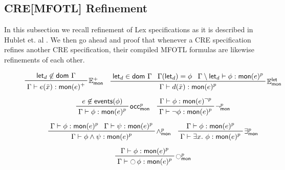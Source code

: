 \subsection{CRE[MFOTL] Refinement}
\label{subsection:refinement-of-cre-specifications}
In this subsection we recall refinement of Lex specifications as it is described in
Hublet et. al \cite{lex}. We then go ahead and proof that whenever a CRE
specification refines another CRE specification, their compiled MFOTL
formulas are likewise refinements of each other.

\begin{figure}
    \begin{gather*}
        \prftree[r]
            {$\Events^+_\mathsf{mon}$}
            {\mathsf{let}_d \not\in \mathsf{dom}~\Gamma}
            {\Gamma \vdash e(\bar{x}) : \mono{e}^+}
        \quad
        \prftree[r]
            {$\Events^\mathsf{let}_\mathsf{mon}$}
            {\mathsf{let}_d \in \mathsf{dom}~\Gamma}
            {\Gamma(\mathsf{let}_d) = \phi} 
            {\Gamma \setminus \mathsf{let}_d \vdash \phi : \mono{e}^p}
            {\Gamma \vdash d(\bar{x}) : \mono{e}^p}
        \\[5pt]
        \prftree[r]
            {$\mathsf{occ}^p_\mathsf{mon}$}
            {e \not \in \events{\phi}}
            {\Gamma \vdash \phi : \mono{e}^p}
        \quad
        \prftree[r]
            {$\neg^p_\mathsf{mon}$}
            {\Gamma \vdash \phi : \mono{e}^{\neg p}}
            {\Gamma \vdash \neg \phi : \mono{e}^p}
        \\[5pt]
        \prftree[r]
            {$\wedge^p_\mathsf{mon}$}
            {\Gamma \vdash \phi : \mono{e}^p}
            {\Gamma \vdash \psi : \mono{e}^p}
            {\Gamma \vdash \phi \wedge \psi : \mono{e}^p}
        \quad
        \prftree[r]
            {$\exists^p_\mathsf{mon}$}
            {\Gamma \vdash \phi : \mono{e}^p}
            {\Gamma \vdash \exists x.~ \phi : \mono{e}^p}
        \\[5pt]
        \prftree[r]
            {$\Next^p_\mathsf{mon}$}
            {\Gamma \vdash \phi : \mono{e}^p}
            {\Gamma \vdash \Next \phi : \mono{e}^p}

\end{gather*}
\end{figure}
